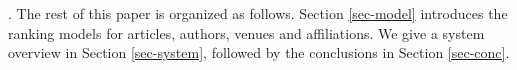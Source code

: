 



.
The rest of this paper is organized as follows. Section \ref{sec-model} introduces the ranking models for articles, authors, venues and affiliations. We give a system overview in Section \ref{sec-system}, followed by the conclusions in Section \ref{sec-conc}.
